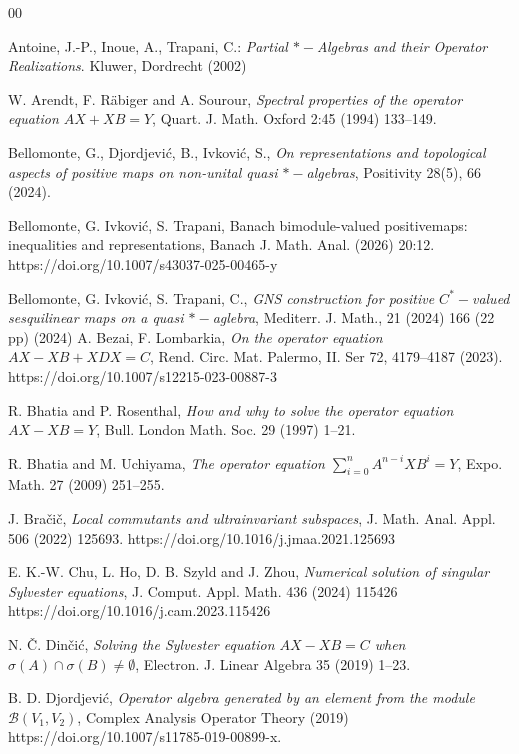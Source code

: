 \documentclass{article}
\theoremstyle{definition}
\begin{document}
\begin{thebibliography}{00}

 Antoine, J.-P., Inoue, A., Trapani, C.: {\it Partial $*-$Algebras and their Operator Realizations}. Kluwer,
Dordrecht (2002)

 W. Arendt, F. R\"{a}biger and A. Sourour, \textit{Spectral properties of the operator equation $AX+XB=Y$}, Quart. J. Math. Oxford 2:45 (1994) 133--149.

 Bellomonte, G., Djordjevi\'c, B., Ivkovi\'c, S.,  {\it On representations and topological aspects of positive
maps on non-unital quasi $*-$algebras}, Positivity 28(5), 66 (2024).

 Bellomonte, G. Ivkovi\'c, S. Trapani, {Banach bimodule-valued positivemaps: inequalities and representations}, Banach J. Math. Anal. (2026) 20:12. https://doi.org/10.1007/s43037-025-00465-y

 Bellomonte, G. Ivkovi\'c, S. Trapani, C., {\it GNS construction for positive $C^*-$valued sesquilinear maps on a quasi $*-$aglebra},  Mediterr. J. Math., 21 (2024) 166 (22 pp) (2024)
 A. Bezai, F. Lombarkia, {\it On the operator equation $AX-XB+XDX=C$},  Rend. Circ. Mat. Palermo, II. Ser 72, 4179--4187 (2023). https://doi.org/10.1007/s12215-023-00887-3


 R. Bhatia and P. Rosenthal, {\it How and why to solve the operator equation $AX-XB=Y$}, Bull. London Math. Soc. {29} (1997) 1--21.

 R. Bhatia and M. Uchiyama, {\it The operator equation $\sum_{i=0}^n A^{n-i}XB^i=Y$}, Expo. Math. 27 (2009) 251--255.

 J. Bra\v ci\v c, {\it Local commutants and ultrainvariant subspaces}, J. Math. Anal. Appl. 506 (2022) 125693. https://doi.org/10.1016/j.jmaa.2021.125693

 E. K.-W. Chu, L. Ho, D. B. Szyld and J. Zhou, {\it Numerical solution of singular Sylvester equations}, J. Comput. Appl. Math. 436 (2024) 115426 https://doi.org/10.1016/j.cam.2023.115426

 N. \v C. Din\v ci\'c, {\it Solving the Sylvester equation $AX-XB = C$ when $\sigma(A)\cap \sigma(B) \neq\emptyset$}, Electron. J. Linear Algebra 35 (2019) 1--23.


 B. D. Djordjevi\'c, {\it Operator algebra generated by an element from the module $\mathcal{B}(V_1,V_2)$}, Complex Analysis Operator Theory (2019)
https://doi.org/10.1007/s11785-019-00899-x.


\end{thebibliography}
\end{document}
